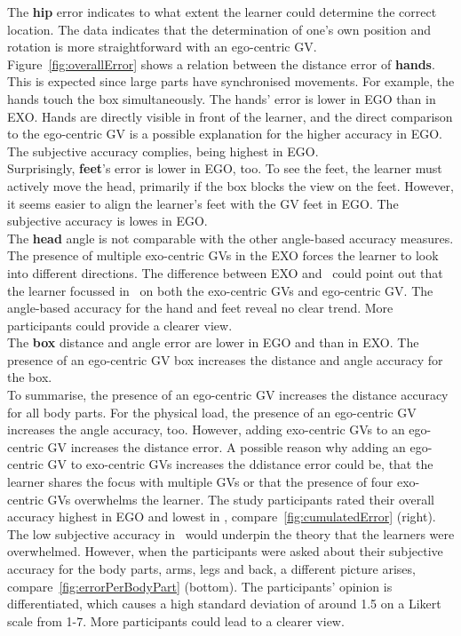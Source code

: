 The \textbf{hip} error indicates to what extent the learner could determine the correct location. The data indicates that the determination of one's own position and rotation is more straightforward with an ego-centric GV.\\
Figure~\ref{fig:overallError} shows a relation between the distance error of \textbf{hands}. This is expected since large parts have synchronised movements. For example, the hands touch the box simultaneously. The hands' error is lower in EGO than in EXO. Hands are directly visible in front of the learner, and the direct comparison to the ego-centric GV is a possible explanation for the higher accuracy in EGO. The subjective accuracy complies, being highest in EGO.\\
Surprisingly, \textbf{feet}'s error is lower in EGO, too. To see the feet, the learner must actively move the head, primarily if the box blocks the view on the feet. However, it seems easier to align the learner's feet with the GV feet in EGO. The subjective accuracy is lowes in EGO.\\
The \textbf{head} angle is not comparable with the other angle-based accuracy measures. The presence of multiple exo-centric GVs in the EXO forces the learner to look into different directions. The difference between EXO and \combi\ could point out that the learner focussed in \combi\ on both the exo-centric GVs and ego-centric GV. The angle-based accuracy for the hand and feet reveal no clear trend. More participants could provide a clearer view.\\
The \textbf{box} distance and angle error are lower in EGO and \combi than in EXO. The presence of an ego-centric GV box increases the distance and angle accuracy for the box.\\

To summarise, the presence of an ego-centric GV increases the distance accuracy for all body parts. For the physical load, the presence of an ego-centric GV increases the angle accuracy, too. However, adding exo-centric GVs to an ego-centric GV increases the distance error. A possible reason why adding an ego-centric GV to exo-centric GVs increases the ddistance error could be, that the learner shares the focus with multiple GVs or that the presence of four exo-centric GVs overwhelms the learner. The study participants rated their overall accuracy highest in EGO and lowest in \combi, compare~\ref{fig:cumulatedError} (right). The low subjective accuracy in \combi\ would underpin the theory that the learners were overwhelmed. However, when the participants were asked about their subjective accuracy for the body parts, arms, legs and back, a different picture arises, compare~\ref{fig:errorPerBodyPart} (bottom). The participants' opinion is differentiated, which causes a high standard deviation of around 1.5 on a Likert scale from 1-7. More participants could lead to a clearer view.\\

